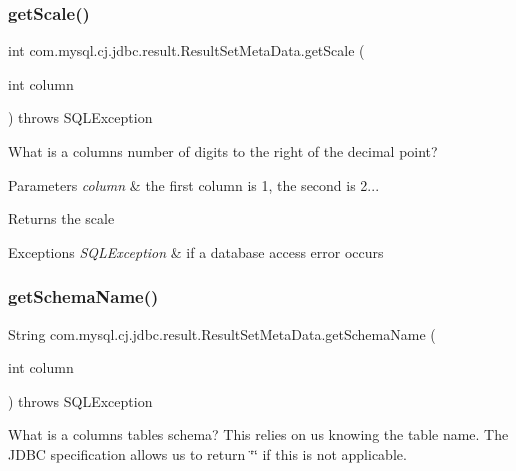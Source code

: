 \subsubsection{\texorpdfstring{get\+Scale()}{getScale()}}
{\footnotesize\ttfamily int com.\+mysql.\+cj.\+jdbc.\+result.\+Result\+Set\+Meta\+Data.\+get\+Scale (\begin{DoxyParamCaption}\item[{int}]{column }\end{DoxyParamCaption}) throws S\+Q\+L\+Exception}

What is a column\textquotesingle{}s number of digits to the right of the decimal point?


\begin{DoxyParams}{Parameters}
{\em column} & the first column is 1, the second is 2...\\
\hline
\end{DoxyParams}
\begin{DoxyReturn}{Returns}
the scale
\end{DoxyReturn}

\begin{DoxyExceptions}{Exceptions}
{\em S\+Q\+L\+Exception} & if a database access error occurs \\
\hline
\end{DoxyExceptions}
\mbox{\label{classcom_1_1mysql_1_1cj_1_1jdbc_1_1result_1_1_result_set_meta_data_a380d616e49af1311581c0e5ac51383a7}} 
\subsubsection{\texorpdfstring{get\+Schema\+Name()}{getSchemaName()}}
{\footnotesize\ttfamily String com.\+mysql.\+cj.\+jdbc.\+result.\+Result\+Set\+Meta\+Data.\+get\+Schema\+Name (\begin{DoxyParamCaption}\item[{int}]{column }\end{DoxyParamCaption}) throws S\+Q\+L\+Exception}

What is a column\textquotesingle{}s table\textquotesingle{}s schema? This relies on us knowing the table name. The J\+D\+BC specification allows us to return \char`\"{}\char`\"{} if this is not applicable.


